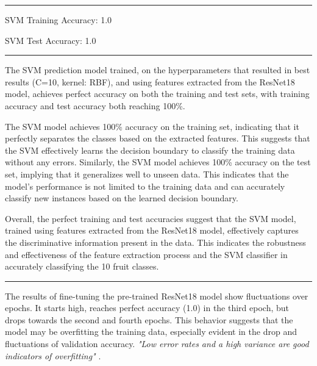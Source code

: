 \documentclass[a4paper,10 pt]{article}
\begin{document}
  \vspace{12pt}

  \hrule

  SVM Training Accuracy: 1.0

  SVM Test Accuracy: 1.0
  \hrule 

  \vspace{12pt}

  The SVM prediction model trained, on the hyperparameters that resulted in best results (C=10, kernel: RBF), and using features extracted from the ResNet18 model, achieves perfect accuracy on both the training and test sets, with training accuracy and test accuracy both reaching 100\%. 

  \vspace{12pt}
  
  The SVM model achieves 100\% accuracy on the training set, indicating that it perfectly separates the classes based on the extracted features. This suggests that the SVM effectively learns the decision boundary to classify the training data without any errors. Similarly, the SVM model achieves 100\% accuracy on the test set, implying that it generalizes well to unseen data. This indicates that the model's performance is not limited to the training data and can accurately classify new instances based on the learned decision boundary.

  \vspace{12pt}

  Overall, the perfect training and test accuracies suggest that the SVM model, trained using features extracted from the ResNet18 model, effectively captures the discriminative information present in the data. This indicates the robustness and effectiveness of the feature extraction process and the SVM classifier in accurately classifying the 10 fruit classes.


  \vspace{12pt}

  \hrule

  \vspace{12pt}

  The results of fine-tuning the pre-trained ResNet18 model show fluctuations over epochs. It starts high, reaches perfect accuracy (1.0) in the third epoch, but drops towards the second and fourth epochs. This behavior suggests that the model may be overfitting the training data, especially evident in the drop and fluctuations of validation accuracy. \textit{"Low error rates and a high variance are good indicators of overfitting"} \cite{ibm_overfitting}.
\end{document}
